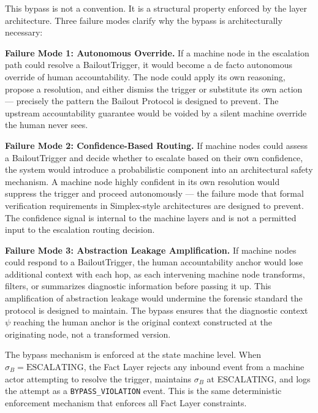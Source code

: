 This bypass is not a convention. It is a structural property enforced by the layer architecture. Three failure modes clarify why the bypass is architecturally necessary:

\bigskip

\noindent\textbf{Failure Mode 1: Autonomous Override.} If a machine node in the escalation path could resolve a BailoutTrigger, it would become a de facto autonomous override of human accountability. The node could apply its own reasoning, propose a resolution, and either dismiss the trigger or substitute its own action --- precisely the pattern the Bailout Protocol is designed to prevent. The upstream accountability guarantee would be voided by a silent machine override the human never sees.

\bigskip

\noindent\textbf{Failure Mode 2: Confidence-Based Routing.} If machine nodes could assess a BailoutTrigger and decide whether to escalate based on their own confidence, the system would introduce a probabilistic component into an architectural safety mechanism. A machine node highly confident in its own resolution would suppress the trigger and proceed autonomously --- the failure mode that formal verification requirements in Simplex-style architectures are designed to prevent. The confidence signal is internal to the machine layers and is not a permitted input to the escalation routing decision.

\bigskip

\noindent\textbf{Failure Mode 3: Abstraction Leakage Amplification.} If machine nodes could respond to a BailoutTrigger, the human accountability anchor would lose additional context with each hop, as each intervening machine node transforms, filters, or summarizes diagnostic information before passing it up. This amplification of abstraction leakage would undermine the forensic standard the protocol is designed to maintain. The bypass ensures that the diagnostic context $\psi$ reaching the human anchor is the original context constructed at the originating node, not a transformed version.

\bigskip

The bypass mechanism is enforced at the state machine level. When $\sigma_B = \text{ESCALATING}$, the Fact Layer rejects any inbound event from a machine actor attempting to resolve the trigger, maintains $\sigma_B$ at ESCALATING, and logs the attempt as a \texttt{BYPASS\_VIOLATION} event. This is the same deterministic enforcement mechanism that enforces all Fact Layer constraints.

